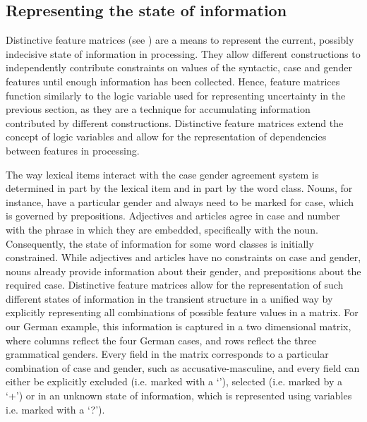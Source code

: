 \subsection{Representing the state of information}
Distinctive feature matrices (see \citealp{vantrijp2011matrices}) are a means to
represent the current, possibly indecisive state of information in
processing. They allow different constructions to independently
contribute constraints on values of the syntactic, case and gender
features until enough information has been collected. Hence, feature
matrices function similarly to the logic variable used for
representing uncertainty in the previous section, as they are a
technique for accumulating information contributed by different
constructions. Distinctive feature matrices extend the concept of
logic variables and allow for the representation of dependencies between features
in processing.

The way lexical items interact with the case gender agreement system
is determined in part by the lexical item and in part by the word
class. Nouns, for instance, have a particular gender and always need to be marked for case,
which is governed by prepositions. Adjectives and articles
agree in case and number with the phrase in which they are embedded,
specifically with the noun. Consequently, the state of information for
some word classes is initially constrained. While adjectives and
articles have no constraints on case and gender, nouns already provide
information about their gender, and prepositions about the required
case. Distinctive feature matrices allow for the representation of such different
states of information in the transient structure in a unified way by
explicitly representing all combinations of possible feature values
in a matrix. For our German example, this information is captured in
a two dimensional matrix, where columns reflect the four German cases,
and rows reflect the three grammatical genders. Every field in the
matrix corresponds to a particular combination of case and gender,
such as accusative-masculine, and every field can either be explicitly
excluded (i.e. marked with a `{\textminus}'), selected (i.e.  marked by a `+') or
in an unknown state of information, which is represented using
variables i.e. marked with a `?').

